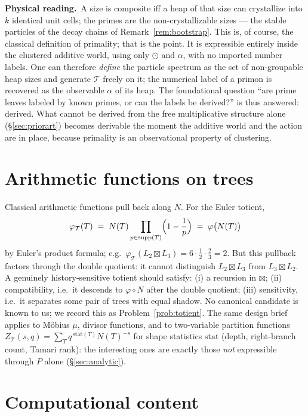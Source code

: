 \documentclass[11pt]{article}
\newcommand{\cT}{\mathcal{T}}   %
\newcommand{\physread}{\medskip\noindent\textbf{Physical reading.}\ }
\DeclareMathOperator{\supp}{supp}
\numberwithin{equation}{section}
\theoremstyle{plain}
\theoremstyle{definition}
\theoremstyle{remark}
\begin{document}
\physread A size is composite iff a heap of that size can crystallize into $k$
identical unit cells; the primes are the non-crystallizable sizes --- the stable
particles of the decay chains of Remark~\ref{rem:bootstrap}. This is, of course, the
classical definition of primality; that is the point. It is expressible entirely
inside the clustered additive world, using only $\odot$ and $\alpha$, with no imported
number labels. One can therefore \emph{define} the particle spectrum as the set of
non-groupable heap sizes and generate $\cT$ freely on it; the numerical label of a
primon is recovered as the observable $\alpha$ of its heap. The foundational question
``are prime leaves labeled by known primes, or can the labels be derived?'' is thus
answered: derived. What cannot be derived from the free multiplicative structure alone
(\S\ref{sec:priorart}) becomes derivable the moment the additive world and the action
are in place, because primality is an observational property of clustering.

\section{Arithmetic functions on trees}\label{sec:functions}

Classical arithmetic functions pull back along $N$. For the Euler totient,
\[
\varphi_\cT(T) \;=\; N(T) \prod_{p \in \supp(T)} \Bigl(1 - \frac1p\Bigr)
\;=\; \varphi\bigl(N(T)\bigr)
\]
by Euler's product formula; e.g.\
$\varphi_\cT(L_2 \boxtimes L_3) = 6\cdot\tfrac12\cdot\tfrac23 = 2$.
But this pullback factors through the double quotient: it cannot distinguish
$L_2\boxtimes L_3$ from $L_3 \boxtimes L_2$. A genuinely history-sensitive totient
should satisfy: (i) a recursion in $\boxtimes$; (ii) compatibility, i.e.\ it descends
to $\varphi \circ N$ after the double quotient; (iii) sensitivity, i.e.\ it separates
some pair of trees with equal shadow. No canonical candidate is known to us; we record
this as Problem~\ref{prob:totient}. The same design brief applies to M\"obius $\mu$,
divisor functions, and to two-variable partition functions
$Z_\cT(s, q) = \sum_T q^{\,\mathrm{stat}(T)} N(T)^{-s}$ for shape statistics
$\mathrm{stat}$ (depth, right-branch count, Tamari rank): the interesting ones are
exactly those \emph{not} expressible through $P$ alone (\S\ref{sec:analytic}).

\section{Computational content}\label{sec:comp}
\end{document}
